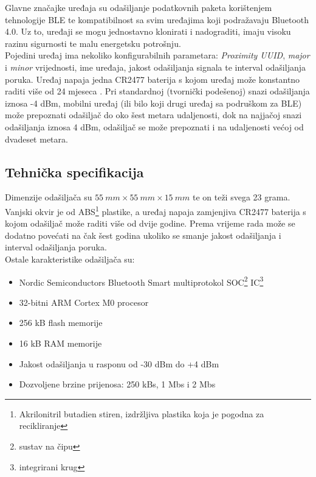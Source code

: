 Glavne značajke uređaja su odašiljanje podatkovnih paketa korištenjem tehnologije BLE te kompatibilnost sa svim uređajima koji podražavaju Bluetooth 4.0. 
Uz to, uređaji se mogu jednostavno klonirati i nadograditi, imaju visoku razinu sigurnosti te malu energetsku potrošnju.
\\
Pojedini uređaj ima nekoliko konfigurabilnih parametara: \textit{Proximity UUID}, \textit{major} i \textit{minor} vrijednosti, ime uređaja, jakost odašiljanja signala te interval odašiljanja poruka.
Uređaj napaja jedna CR2477 baterija s kojom uređaj može konstantno raditi više od 24 mjeseca \citep{kontaktDatasheet}.  
Pri standardnoj (tvornički podešenoj) snazi odašiljanja iznosa -4 dBm, mobilni uređaj (ili bilo koji drugi uređaj sa podruškom za BLE) može prepoznati odašiljač do oko šest metara udaljenosti, dok na najjačoj snazi odašiljanja iznosa 4 dBm, odašiljač se može prepoznati i na udaljenosti većoj od dvadeset metara.

\subsection{Tehnička specifikacija}

Dimenzije odašiljača su $\SI{55}{mm} \times \SI{55}{mm} \times \SI{15}{mm}$ te on teži svega 23 grama. 
Vanjski okvir je od ABS\footnote{Akrilonitril butadien stiren, izdržljiva plastika koja je pogodna za recikliranje} plastike, a uređaj napaja zamjenjiva CR2477 baterija s kojom odašiljač može raditi više od dvije godine. 
Prema \citep{kontaktTehnical} vrijeme rada može se dodatno povećati na čak šest godina ukoliko se smanje jakost odašiljanja i interval odašiljanja poruka.
\\
Ostale karakteristike odašiljača su:

\begin{itemize}
    \item Nordic Semiconductors Bluetooth Smart multiprotokol SOC\footnote{sustav na čipu } IC\footnote{integrirani krug }
    \item 32-bitni ARM Cortex M0 procesor
    \item 256 kB flash memorije
    \item 16 kB RAM memorije
    \item Jakost odašiljanja u rasponu od -30 dBm do +4 dBm 
    \item Dozvoljene brzine prijenosa: 250 kBs, 1 Mbs i 2 Mbs
\end{itemize}

